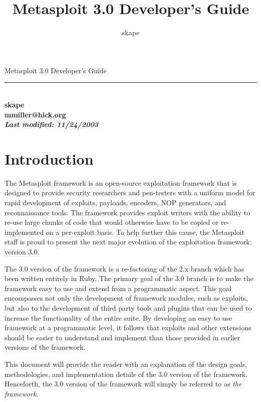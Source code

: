 \documentclass{report}
\begin{document}
\title{Metasploit 3.0 Developer's Guide}
\author{skape}

\begin{titlepage}
    \begin{center}
        \huge{{Metasploit 3.0 Developer's Guide}} \\[150mm]
        \rule{10cm}{1pt} \\[8mm]
        \small\bf{skape} \\
        \small\bf{mmiller@hick.org} \\[4mm]
        \textit{Last modified: \small{11/24/2003}}
    \end{center}
\end{titlepage}

\tableofcontents

\setlength{\parindent}{0pt} \setlength{\parskip}{8pt}

\chapter{Introduction}

\par
The Metasploit framework is an open-source exploitation framework
that is designed to provide security researchers and pen-testers
with a uniform model for rapid development of exploits, payloads,
encoders, NOP generators, and reconnaissance tools.  The framework
provides exploit writers with the ability to re-use large chunks of
code that would otherwise have to be copied or re-implemented on a
per-exploit basis.  To help further this cause, the Metasploit staff
is proud to present the next major evolution of the exploitation
framework: version 3.0.

\par
The 3.0 version of the framework is a re-factoring of the 2.x branch
which has been written entirely in Ruby.  The primary goal of the
3.0 branch is to make the framework easy to use and extend from a
programmatic aspect.  This goal encompasses not only the development
of framework modules, such as exploits, but also to the development
of third party tools and plugins that can be used to increase the
functionality of the entire suite.  By developing an easy to use
framework at a programmatic level, it follows that exploits and
other extensions should be easier to understand and implement than
those provided in earlier versions of the framework.

\par
This document will provide the reader with an explanation of the
design goals, methodologies, and implementation details of the 3.0
version of the framework.  Henceforth, the 3.0 version of the
framework will simply be referred to as \textit{the framework}.
\end{document}
